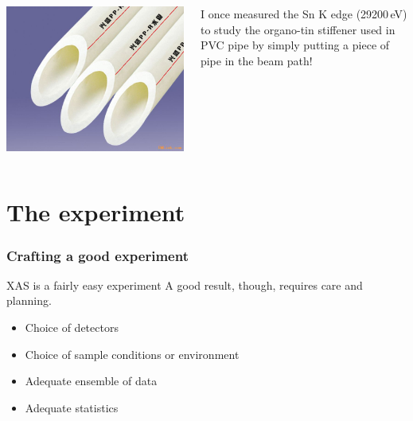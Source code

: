 \documentclass[10pt, xcolor=x11names, compress]{beamer}
\begin{document}
\begin{frame}
  \begin{columns}
    \begin{column}{0.35\linewidth}
      \begin{center}
        \includegraphics[width=0.8\linewidth]{sample/PVC.jpg}
      \end{center}
    \end{column}
    \begin{column}{0.65\linewidth}
      I once measured the Sn K edge (29200\,eV) to study the organo-tin
      stiffener used in PVC pipe by simply putting a piece of pipe in
      the beam path!
    \end{column}
  \end{columns}

\end{frame}

\section{The experiment}
\label{sec:exp}

\begin{frame}
  \frametitle{Crafting a good experiment}
  \begin{block}{XAS is a fairly easy experiment}
    A good result, though, requires care and planning.
  \end{block}
  \begin{itemize}
  \item Choice of detectors
  \item Choice of sample conditions or environment
  \item Adequate ensemble of data
  \item Adequate statistics
  \end{itemize}
\end{frame}
\end{document}
